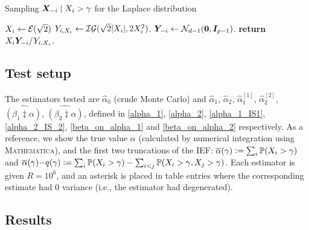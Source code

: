 \begin{algorithm}
\caption{Sampling $\bm{X}_{-i} \mid X_i > \gamma$ for the Laplace distribution}
\label{alg:cond_normals}
\begin{algorithmic}[1]
\State $X_i \gets \mathcal{E}(\sqrt{2})$
\State $Y_{i,X_i} \gets \mathcal{IG}(\sqrt{2} |X_i|,2 X_i^2)$.
\State $\bm{Y}_{-i} \gets \mathcal{N}_{d-1}(\mathbf{0},\bm{I}_{p-1})$.
\State \textbf{return} $X_i \bm{Y}_{-i} / Y_{i,X_i}$.
\end{algorithmic}
\end{algorithm}

\subsection{Test setup}

The estimators tested are $\hat{\alpha}_0$ (crude Monte Carlo) and 
 $\hat{\alpha}_1$, $\hat{\alpha}_2$, $\hat{\alpha}_1^{[1]}$, $\hat{\alpha}_2^{[2]}$, $\widehat{(\beta_1 \ddagger \alpha)}$, $\widehat{(\beta_2 \ddagger \alpha)}$, defined in \eqref{alpha_1}, \eqref{alpha_2}, \eqref{alpha_1_IS1}, \eqref{alpha_2_IS_2}, \eqref{beta_on_alpha_1} and \eqref{beta_on_alpha_2} respectively. As a reference, we show the true value $\alpha$ (calculated by numerical integration using \textsc{Mathematica}), and the first two truncations of the IEF:
$ \overline{\alpha}(\gamma) := \sum_i \operatorname{{\mathbb P}}(X_i > \gamma)$ and $\overline{\alpha}(\gamma){-}q(\gamma) := \sum_i \operatorname{{\mathbb P}}(X_i > \gamma) - \sum_{i<j} \operatorname{{\mathbb P}}(X_i > \gamma, X_j > \gamma)$.
Each estimator is given $R=10^6$, and an asterisk is placed in table entries where the corresponding estimate had 0 variance (i.e., the estimator had degenerated).
% 

\newpage
\subsection{Results}
\enlargethispage{1cm}

